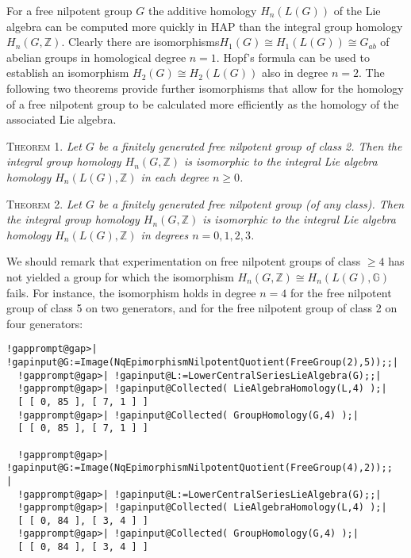 \documentclass[a4paper,11pt]{report}
\begin{document}
{{\begin{Verbatim}[commandchars=!@|,fontsize=\small,frame=single,label=Example]
\end{Verbatim}
 

 For a free nilpotent group $G$ the additive homology $H_n(L(G))$ of the Lie algebra can be computed more quickly in \textsc{HAP} than the integral group homology $H_n(G,\mathbb Z)$. Clearly there are isomorphisms$H_1(G) \cong H_1(L(G)) \cong G_{ab}$ of abelian groups in homological degree $n=1$. Hopf's formula can be used to establish an isomorphism $H_2(G) \cong H_2(L(G))$ also in degree $n=2$. The following two theorems provide further isomorphisms that allow for the
homology of a free nilpotent group to be calculated more efficiently as the
homology of the associated Lie algebra. 

\textsc{Theorem 1.} \cite{kuzmin} \emph{Let $G$ be a finitely generated free nilpotent group of class 2. Then the integral
group homology $H_n(G,\mathbb Z)$ is isomorphic to the integral Lie algebra homology $H_n(L(G),\mathbb Z)$ in each degree $n\ge0$.} 

 \textsc{Theorem 2.} \cite{igusa} \emph{Let $G$ be a finitely generated free nilpotent group (of any class). Then the integral
group homology $H_n(G,\mathbb Z)$ is isomorphic to the integral Lie algebra homology $H_n(L(G),\mathbb Z)$ in degrees $n=0, 1, 2, 3$.} 

We should remark that experimentation on free nilpotent groups of class $\ge 4$ has not yielded a group for which the isomorphism $H_n(G,\mathbb Z) \cong H_n(L(G),\mathbb G)$ fails. For instance, the isomorphism holds in degree $n=4$ for the free nilpotent group of class 5 on two generators, and for the free
nilpotent group of class 2 on four generators: 
\begin{Verbatim}[commandchars=!@|,fontsize=\small,frame=single,label=Example]
  !gapprompt@gap>| !gapinput@G:=Image(NqEpimorphismNilpotentQuotient(FreeGroup(2),5));;|
  !gapprompt@gap>| !gapinput@L:=LowerCentralSeriesLieAlgebra(G);;|
  !gapprompt@gap>| !gapinput@Collected( LieAlgebraHomology(L,4) );|
  [ [ 0, 85 ], [ 7, 1 ] ]
  !gapprompt@gap>| !gapinput@Collected( GroupHomology(G,4) );|
  [ [ 0, 85 ], [ 7, 1 ] ]
  
  !gapprompt@gap>| !gapinput@G:=Image(NqEpimorphismNilpotentQuotient(FreeGroup(4),2));;  |
  !gapprompt@gap>| !gapinput@L:=LowerCentralSeriesLieAlgebra(G);;|
  !gapprompt@gap>| !gapinput@Collected( LieAlgebraHomology(L,4) );|
  [ [ 0, 84 ], [ 3, 4 ] ]
  !gapprompt@gap>| !gapinput@Collected( GroupHomology(G,4) );|
  [ [ 0, 84 ], [ 3, 4 ] ]
  
\end{Verbatim}
 }

}
\end{document}

